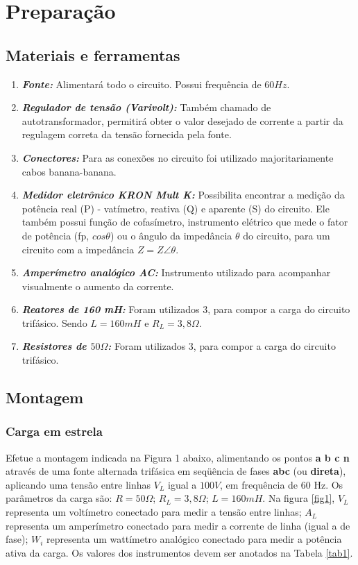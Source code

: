 \documentclass[a4paper,12pt,oneside,openany,table,xcdraw]{article}
\begin{document}
\section{Preparação}
\subsection{Materiais e ferramentas} %
\begin{enumerate}[1 -]
\item \emph{\textbf{Fonte:}}
Alimentará todo o circuito. Possui frequência de $60Hz$.

\item \emph{\textbf{Regulador de tensão (Varivolt):}}
Também chamado de autotransformador, permitirá obter o valor desejado de corrente a partir da regulagem correta da tensão fornecida pela fonte.

\item \emph{\textbf{Conectores:}}
Para as conexões no circuito foi utilizado majoritariamente cabos banana-banana.

\item \emph{\textbf{Medidor eletrônico KRON Mult K:}}
Possibilita encontrar a medição da potência real (P) - vatímetro, reativa (Q) e aparente (S) do circuito. Ele também possui função de cofasímetro, instrumento elétrico que mede o fator de potência (fp, $cos\theta$) ou o ângulo da impedância $\theta$ do circuito, para um circuito com a impedância $Z = Z\angle \theta$.

\item \emph{\textbf{Amperímetro analógico AC:}}
Instrumento utilizado para acompanhar visualmente o aumento da corrente.

\item \emph{\textbf{Reatores de 160 mH:}}
Foram utilizados 3, para compor a carga do circuito trifásico. Sendo $L=160mH$ e $R_L=3,8\Omega$.

\item \emph{\textbf{Resistores de $50\Omega$:}}
Foram utilizados 3, para compor a carga do circuito trifásico.
\end{enumerate}

\subsection{Montagem} %

\subsubsection{Carga em estrela}
 Efetue a montagem indicada na Figura 1 abaixo, alimentando os pontos \textbf{a b c n} através de uma fonte alternada trifásica em seqüência de fases \textbf{abc} (ou \textbf{direta}), aplicando uma tensão entre linhas $V_L$ igual a $100 V$, em frequência de 60 Hz. Os parâmetros da carga são: $R = 50 \Omega$; $R_L = 3,8\Omega$; $L = 160 mH$. Na figura \ref{fig1}, $V_L$ representa um voltímetro conectado para medir a tensão entre linhas; $A_L$ representa um amperímetro conectado para medir a corrente de linha (igual a de fase); $W_i$ representa um wattímetro analógico conectado para medir a potência ativa da carga. Os valores dos instrumentos devem ser anotados na Tabela \ref{tab1}.  
\end{document}
